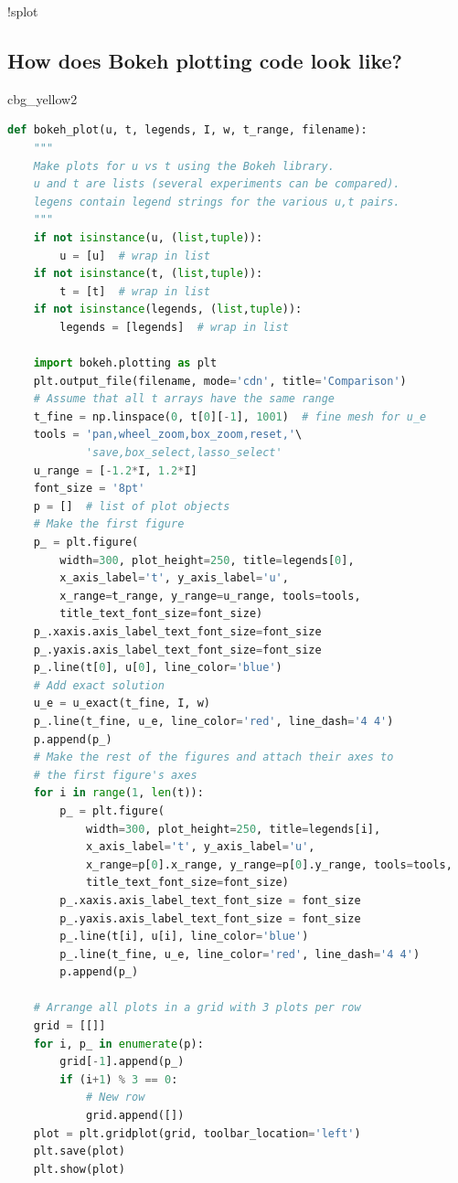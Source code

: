 \documentclass[%
oneside,                 %
final,                   %
10pt]{article}
\newenvironment{_cod_tight}[1]{
   \def\FrameCommand{\colorbox{#1}}
   \FrameRule0.6pt\MakeFramed {\FrameRestore}\vskip3mm}
   {\vskip0mm\endMakeFramed}
\newenvironment{cod}[1]{
\bgroup\rmfamily
\fboxsep=0mm\relax
\begin{_cod_tight}{#1}
\list{}{\parsep=-2mm\parskip=0mm\topsep=0pt\leftmargin=2mm
\rightmargin=2\leftmargin\leftmargin=4pt\relax}
\item\relax}
{\endlist\end{_cod_tight}\egroup}
\begin{document}
!splot
\subsection*{How does Bokeh plotting code look like?}

\begin{cod}{cbg_yellow2}\begin{lstlisting}[language=Python,style=simple,xleftmargin=2mm]
def bokeh_plot(u, t, legends, I, w, t_range, filename):
    """
    Make plots for u vs t using the Bokeh library.
    u and t are lists (several experiments can be compared).
    legens contain legend strings for the various u,t pairs.
    """
    if not isinstance(u, (list,tuple)):
        u = [u]  # wrap in list
    if not isinstance(t, (list,tuple)):
        t = [t]  # wrap in list
    if not isinstance(legends, (list,tuple)):
        legends = [legends]  # wrap in list

    import bokeh.plotting as plt
    plt.output_file(filename, mode='cdn', title='Comparison')
    # Assume that all t arrays have the same range
    t_fine = np.linspace(0, t[0][-1], 1001)  # fine mesh for u_e
    tools = 'pan,wheel_zoom,box_zoom,reset,'\ 
            'save,box_select,lasso_select'
    u_range = [-1.2*I, 1.2*I]
    font_size = '8pt'
    p = []  # list of plot objects
    # Make the first figure
    p_ = plt.figure(
        width=300, plot_height=250, title=legends[0],
        x_axis_label='t', y_axis_label='u',
        x_range=t_range, y_range=u_range, tools=tools,
        title_text_font_size=font_size)
    p_.xaxis.axis_label_text_font_size=font_size
    p_.yaxis.axis_label_text_font_size=font_size
    p_.line(t[0], u[0], line_color='blue')
    # Add exact solution
    u_e = u_exact(t_fine, I, w)
    p_.line(t_fine, u_e, line_color='red', line_dash='4 4')
    p.append(p_)
    # Make the rest of the figures and attach their axes to
    # the first figure's axes
    for i in range(1, len(t)):
        p_ = plt.figure(
            width=300, plot_height=250, title=legends[i],
            x_axis_label='t', y_axis_label='u',
            x_range=p[0].x_range, y_range=p[0].y_range, tools=tools,
            title_text_font_size=font_size)
        p_.xaxis.axis_label_text_font_size = font_size
        p_.yaxis.axis_label_text_font_size = font_size
        p_.line(t[i], u[i], line_color='blue')
        p_.line(t_fine, u_e, line_color='red', line_dash='4 4')
        p.append(p_)

    # Arrange all plots in a grid with 3 plots per row
    grid = [[]]
    for i, p_ in enumerate(p):
        grid[-1].append(p_)
        if (i+1) % 3 == 0:
            # New row
            grid.append([])
    plot = plt.gridplot(grid, toolbar_location='left')
    plt.save(plot)
    plt.show(plot)
\end{lstlisting}\end{cod}
\noindent
\end{document}
